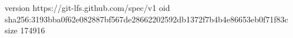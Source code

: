 version https://git-lfs.github.com/spec/v1
oid sha256:3193bba0f62e082887bf567de28662202592db1372f7b4b4e86653eb0f71f83c
size 174916
